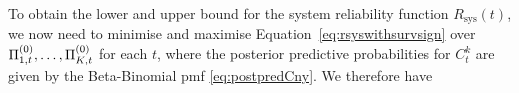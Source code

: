 \documentclass[12pt, a4paper]{elsarticle}
\newcommand{\Rsys}{R_\text{sys}}
\begin{document}
To obtain the lower and upper bound for the system reliability function $\Rsys(t)$,
we now need to minimise and maximise Equation~\eqref{eq:rsyswithsurvsign} over $\Pi^{(0)}_{1,t}, \ldots, \Pi^{(0)}_{K,t}$ for each $t$,
where the posterior predictive probabilities for $C^k_t$ are given by the Beta-Binomial pmf \eqref{eq:postpredCny}.
%
We therefore have
%
\end{document}
